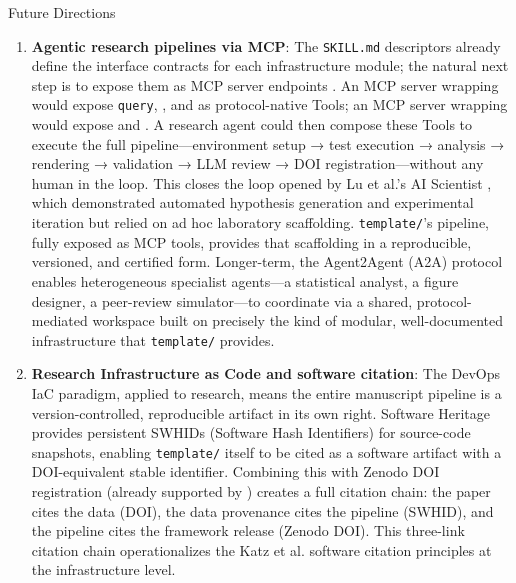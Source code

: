 \documentclass[
  ignorenonframetext,
]{beamer}
\begin{document}
\begin{frame}{Future Directions}
\begin{enumerate}
  \textbf{Formal verification}: Static analysis tooling to enforce the
  Thin Orchestrator pattern---verifying that scripts contain no
  algorithmic logic and that \texttt{src/} modules do not import from
  \texttt{scripts/}.
\item
  \textbf{Agentic research pipelines via MCP}: The \texttt{SKILL.md}
  descriptors already define the interface contracts for each
  infrastructure module; the natural next step is to expose them as MCP
  server endpoints . An MCP server wrapping
   would expose \texttt{query},
  , and  as
  protocol-native Tools; an MCP server wrapping
   would expose
   and .
  A research agent could then compose these Tools to execute the full
  pipeline---environment setup → test execution → analysis → rendering →
  validation → LLM review → DOI registration---without any human in the
  loop. This closes the loop opened by Lu et al.'s AI Scientist
  \breakseq{[@lu2024aiscientist]}, which demonstrated automated hypothesis
  generation and experimental iteration but relied on ad hoc laboratory
  scaffolding. \texttt{template/}'s pipeline, fully exposed as MCP
  tools, provides that scaffolding in a reproducible, versioned, and
  certified form. Longer-term, the Agent2Agent (A2A) protocol
  \breakseq{[@google2025a2a]} enables heterogeneous specialist agents---a
  statistical analyst, a figure designer, a peer-review simulator---to
  coordinate via a shared, protocol-mediated workspace built on
  precisely the kind of modular, well-documented infrastructure that
  \texttt{template/} provides.
\item
  \textbf{Research Infrastructure as Code and software citation}: The
  DevOps IaC paradigm, applied to research, means the entire manuscript
  pipeline is a version-controlled, reproducible artifact in its own
  right. Software Heritage  provides
  persistent SWHIDs (Software Hash Identifiers) for source-code
  snapshots, enabling \texttt{template/} itself to be cited as a
  software artifact with a DOI-equivalent stable identifier. Combining
  this with Zenodo DOI registration (already supported by
  ) creates a full citation chain: the
  paper cites the data (DOI), the data provenance cites the pipeline
  (SWHID), and the pipeline cites the framework release (Zenodo DOI).
  This three-link citation chain operationalizes the Katz et al.
   software citation principles at the
  infrastructure level.
\end{enumerate}
\end{frame}
\end{document}
